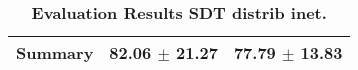 \begin{table}[htb]
{\begin{tabular}{lll}
\midrule
\textbf{Summary                                  } &                  \phantom{0}82.06 $\pm$ 21.27 &                      \phantom{0}77.79 $\pm$ 13.83 \\
\bottomrule
\end{tabular}%
}
\caption{\textbf{Evaluation Results SDT distrib inet.}}
\label{tab:eval-results}
\end{table}


